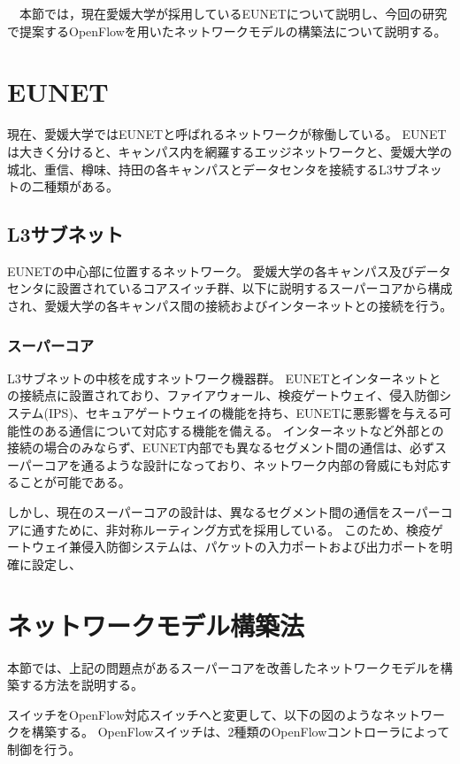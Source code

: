 　本節では，現在愛媛大学が採用しているEUNETについて説明し、今回の研究で提案するOpenFlowを用いたネットワークモデルの構築法について説明する。

\section{EUNET}

現在、愛媛大学ではEUNETと呼ばれるネットワークが稼働している。
EUNETは大きく分けると、キャンパス内を網羅するエッジネットワークと、愛媛大学の城北、重信、樽味、持田の各キャンパスとデータセンタを接続するL3サブネットの二種類がある。

\subsection{L3サブネット}

EUNETの中心部に位置するネットワーク。
愛媛大学の各キャンパス及びデータセンタに設置されているコアスイッチ群、以下に説明するスーパーコアから構成され、愛媛大学の各キャンパス間の接続およびインターネットとの接続を行う。

\subsubsection{スーパーコア}

L3サブネットの中核を成すネットワーク機器群。
EUNETとインターネットとの接続点に設置されており、ファイアウォール、検疫ゲートウェイ、侵入防御システム(IPS)、セキュアゲートウェイの機能を持ち、EUNETに悪影響を与える可能性のある通信について対応する機能を備える。
インターネットなど外部との接続の場合のみならず、EUNET内部でも異なるセグメント間の通信は、必ずスーパーコアを通るような設計になっており、ネットワーク内部の脅威にも対応することが可能である。

しかし、現在のスーパーコアの設計は、異なるセグメント間の通信をスーパーコアに通すために、非対称ルーティング方式を採用している。
このため、検疫ゲートウェイ兼侵入防御システムは、パケットの入力ポートおよび出力ポートを明確に設定し、

\section{ネットワークモデル構築法}

本節では、上記の問題点があるスーパーコアを改善したネットワークモデルを構築する方法を説明する。

スイッチをOpenFlow対応スイッチへと変更して、以下の図のようなネットワークを構築する。
OpenFlowスイッチは、2種類のOpenFlowコントローラによって制御を行う。

